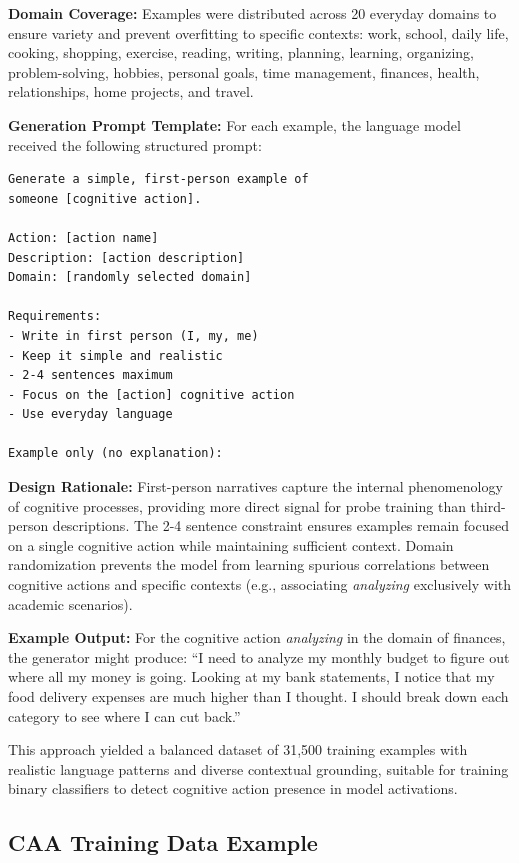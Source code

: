 \documentclass[letterpaper]{article}
\begin{document}
\textbf{Domain Coverage:} Examples were distributed across 20 everyday domains to ensure variety and prevent overfitting to specific contexts: work, school, daily life, cooking, shopping, exercise, reading, writing, planning, learning, organizing, problem-solving, hobbies, personal goals, time management, finances, health, relationships, home projects, and travel.

\textbf{Generation Prompt Template:} For each example, the language model received the following structured prompt:

\begin{verbatim}
Generate a simple, first-person example of
someone [cognitive action].

Action: [action name]
Description: [action description]
Domain: [randomly selected domain]

Requirements:
- Write in first person (I, my, me)
- Keep it simple and realistic
- 2-4 sentences maximum
- Focus on the [action] cognitive action
- Use everyday language

Example only (no explanation):
\end{verbatim}

\textbf{Design Rationale:} First-person narratives capture the internal phenomenology of cognitive processes, providing more direct signal for probe training than third-person descriptions. The 2-4 sentence constraint ensures examples remain focused on a single cognitive action while maintaining sufficient context. Domain randomization prevents the model from learning spurious correlations between cognitive actions and specific contexts (e.g., associating \textit{analyzing} exclusively with academic scenarios).

\textbf{Example Output:} For the cognitive action \textit{analyzing} in the domain of finances, the generator might produce: ``I need to analyze my monthly budget to figure out where all my money is going. Looking at my bank statements, I notice that my food delivery expenses are much higher than I thought. I should break down each category to see where I can cut back.''

This approach yielded a balanced dataset of 31,500 training examples with realistic language patterns and diverse contextual grounding, suitable for training binary classifiers to detect cognitive action presence in model activations.

\subsection{CAA Training Data Example}
\end{document}
